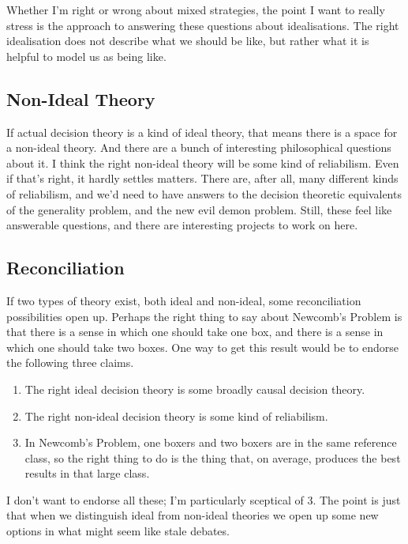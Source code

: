\documentclass[
  12pt,
  letterpaper,
  DIV=11,
  numbers=noendperiod,
  twoside]{scrartcl}
\providecommand{\tightlist}{%
  \setlength{\itemsep}{0pt}\setlength{\parskip}{0pt}}
\begin{document}
Whether I'm right or wrong about mixed strategies, the point I want to
really stress is the approach to answering these questions about
idealisations. The right idealisation does not describe what we should
be like, but rather what it is helpful to model us as being like.

\subsection{Non-Ideal Theory}\label{non-ideal-theory}

If actual decision theory is a kind of ideal theory, that means there is
a space for a non-ideal theory. And there are a bunch of interesting
philosophical questions about it. I think the right non-ideal theory
will be some kind of reliabilism. Even if that's right, it hardly
settles matters. There are, after all, many different kinds of
reliabilism, and we'd need to have answers to the decision theoretic
equivalents of the generality problem, and the new evil demon problem.
Still, these feel like answerable questions, and there are interesting
projects to work on here.

\subsection{Reconciliation}\label{reconciliation}

If two types of theory exist, both ideal and non-ideal, some
reconciliation possibilities open up. Perhaps the right thing to say
about Newcomb's Problem is that there is a sense in which one should
take one box, and there is a sense in which one should take two boxes.
One way to get this result would be to endorse the following three
claims.

\begin{enumerate}
\def\labelenumi{\arabic{enumi}.}
\tightlist
\item
  The right ideal decision theory is some broadly causal decision
  theory.
\item
  The right non-ideal decision theory is some kind of reliabilism.
\item
  In Newcomb's Problem, one boxers and two boxers are in the same
  reference class, so the right thing to do is the thing that, on
  average, produces the best results in that large class.
\end{enumerate}

I don't want to endorse all these; I'm particularly sceptical of 3. The
point is just that when we distinguish ideal from non-ideal theories we
open up some new options in what might seem like stale debates.
\end{document}
